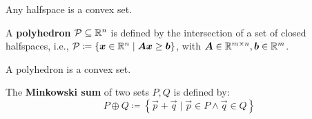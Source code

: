 \begin{corollary}\label{cor:halfspace_convex}
Any halfspace is a convex set.
\end{corollary}

\iffalse
\begin{proof}
Let $\polyhedron{H}^+ = \{\vec{x} \mid \vec{f}\transpose \vec{x} > f\}$ be an open halfspace (analogous for $\polyhedron{H}^- = \{\vec{x} \mid \vec{f}\transpose \vec{x} < f\}$, and for the closed halfspaces). Let $k \in \mathbb{N}$, $\vec{x_1}, \dots, \vec{x_k} \in \polyhedron{H}^+$. For any $\alpha_1, \dots, \alpha_k \in \mathbb{R}_+$ with $\sum_{i=1}^{k} \alpha_i = 1$:

\begin{align*}
\vec{f}\transpose \left( \sum_{i=1}^{k} \alpha_i \vec{x}_i \right)
&= \sum_{i=1}^{k} \alpha_i \vec{f}\transpose \vec{x}_i \\
&> \sum_{i=1}^{k} \alpha_i \cdot f \\
&= f \cdot \sum_{i=1}^{k} \alpha_i \\
&= f
\end{align*}

Therefore, the convex combination $\sum_{i=1}^{k} \alpha_i \vec{x}_i$ is in the halfspace $\polyhedron{H}^+$.
\end{proof}
\fi

\begin{definition}
A \textbf{polyhedron} $\mathcal{P} \subseteq \mathbb{R}^n$ is defined by the intersection of a set of closed halfspaces, i.e., $\mathcal{P} \coloneqq \{{\bm{x}} \in \mathbb{R}^n \mid {\bm{A}} {\bm{x}} \geq {\bm{b}}\}$, with ${\bm{A}} \in \mathbb{R}^{m \times n}, {\bm{b}} \in \mathbb{R}^m$.
\end{definition}

\begin{corollary}
A polyhedron is a convex set.
\end{corollary}

\iffalse
\begin{proof}
Follows from Corollaries \ref{cor:intersection_convex} and \ref{cor:halfspace_convex}.
\end{proof}
\fi

\begin{definition}
The \textbf{Minkowski sum} of two sets $P, Q$ is defined by:
\begin{equation*}
P \oplus Q \coloneqq \left\{\vec{p} + \vec{q} \mid \vec{p} \in P \land \vec{q} \in Q \right\}
\end{equation*}
\end{definition}

